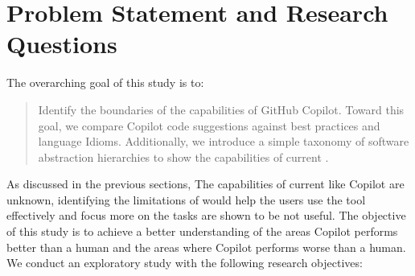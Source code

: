 \section{Problem Statement and Research Questions}
The overarching goal of this study is to:
\begin{quote}
    Identify the boundaries of the capabilities of GitHub Copilot. Toward this goal, we compare Copilot code suggestions against best practices and language Idioms. Additionally, we introduce a simple taxonomy of software abstraction hierarchies to show the capabilities of current \cct{}. 
\end{quote}

As discussed in the previous sections, The capabilities of current \cct{} like Copilot are unknown, identifying the limitations of \cct{} would help the users use the tool effectively and focus more on the tasks \cct{} are shown to be not useful. The objective of this study is to achieve a better understanding of the areas Copilot performs better than a human and the areas where Copilot performs worse than a human. We conduct an exploratory study with the following research objectives:

